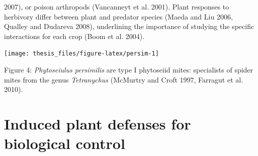\documentclass[12pt,final,CPage]{ufthesis}
\begin{document}
{2007), or poison arthropods (Vancanneyt et al. 2001). Plant responses to herbivory differ between plant and predator species (Maeda and Liu 2006, Qualley and Dudareva 2008), underlining the importance of studying the specific interactions for each crop (Boom et al. 2004).
  \begin{center}\texttt{[image: thesis\_files/figure-latex/persim-1]} \end{center}

  Figure 4: \emph{Phytoseiulus persimilis} are type I phytoseiid mites: specialists of spider mites from the genus \emph{Tetranychus} (McMurtry and Croft 1997, Farragut et al. 2010).

  \hypertarget{litrev-plantdef}{%
  \section{Induced plant defenses for biological control}\label{litrev-plantdef}}

}
\end{document}
